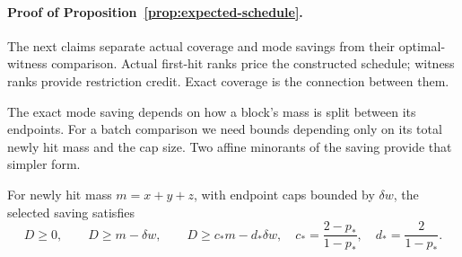 \paragraph{Proof of Proposition~\ref{prop:expected-schedule}.}
The next claims separate actual coverage and mode savings from their
optimal-witness comparison. Actual first-hit ranks price the constructed
schedule; witness ranks provide restriction credit. Exact coverage is
the connection between them.

The exact mode saving depends on how a block's mass is split between
its endpoints. For a batch comparison we need bounds depending only
on its total newly hit mass and the cap size. Two affine minorants
of the saving provide that simpler form.
\begin{claim}
\label{lem:affine-block-credit}
For newly hit mass $m=x+y+z$, with endpoint caps bounded by
$\delta w$, the selected saving satisfies
\[
 D\ge0,\qquad D\ge m-\delta w,\qquad
 D\ge c_*m-d_*\delta w,
 \quad c_*=\frac{2-p_*}{1-p_*},\quad d_*=\frac2{1-p_*}.
\]
\end{claim}
